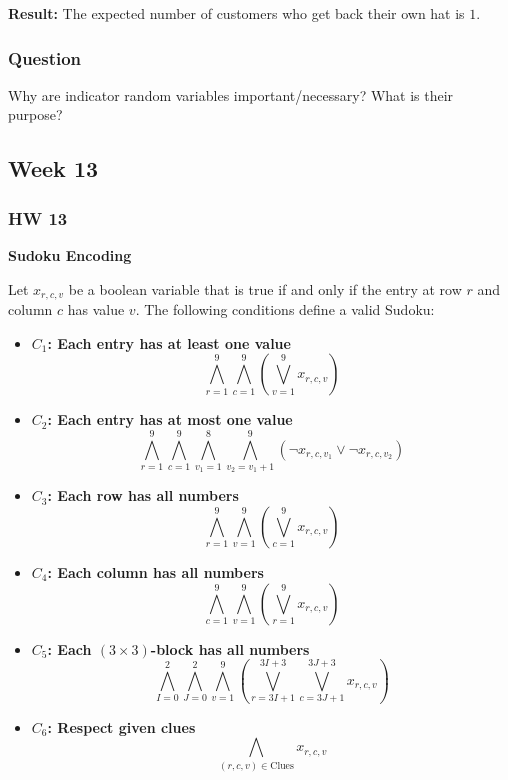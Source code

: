 \documentclass{article}
\theoremstyle{theorem}
\theoremstyle{definition}
\theoremstyle{remark}
\begin{document}
\textbf{Result:} The expected number of customers who get back their own hat is $1$.

\subsubsection{Question}
Why are indicator random variables important/necessary? What is their purpose?

\subsection{Week 13}

\subsubsection{HW 13}

\textbf{Sudoku Encoding}

Let $x_{r,c,v}$ be a boolean variable that is true if and only if the entry at row $r$ and column $c$ has value $v$. The following conditions define a valid Sudoku:

\begin{itemize}
    \item \textbf{$C_1$: Each entry has at least one value}
    \[ \bigwedge_{r=1}^9 \bigwedge_{c=1}^9 \left( \bigvee_{v=1}^9 x_{r,c,v} \right) \]

    \item \textbf{$C_2$: Each entry has at most one value}
    \[ \bigwedge_{r=1}^9 \bigwedge_{c=1}^9 \bigwedge_{v_1=1}^8 \bigwedge_{v_2=v_1+1}^9 (\neg x_{r,c,v_1} \vee \neg x_{r,c,v_2}) \]

    \item \textbf{$C_3$: Each row has all numbers}
    \[ \bigwedge_{r=1}^9 \bigwedge_{v=1}^9 \left( \bigvee_{c=1}^9 x_{r,c,v} \right) \]

    \item \textbf{$C_4$: Each column has all numbers}
    \[ \bigwedge_{c=1}^9 \bigwedge_{v=1}^9 \left( \bigvee_{r=1}^9 x_{r,c,v} \right) \]

    \item \textbf{$C_5$: Each $(3 \times 3)$-block has all numbers}
    \[ \bigwedge_{I=0}^2 \bigwedge_{J=0}^2 \bigwedge_{v=1}^9 \left( \bigvee_{r=3I+1}^{3I+3} \bigvee_{c=3J+1}^{3J+3} x_{r,c,v} \right) \]

    \item \textbf{$C_6$: Respect given clues}
    \[ \bigwedge_{(r,c,v) \in \text{Clues}} x_{r,c,v} \]
\end{itemize}
\end{document}
